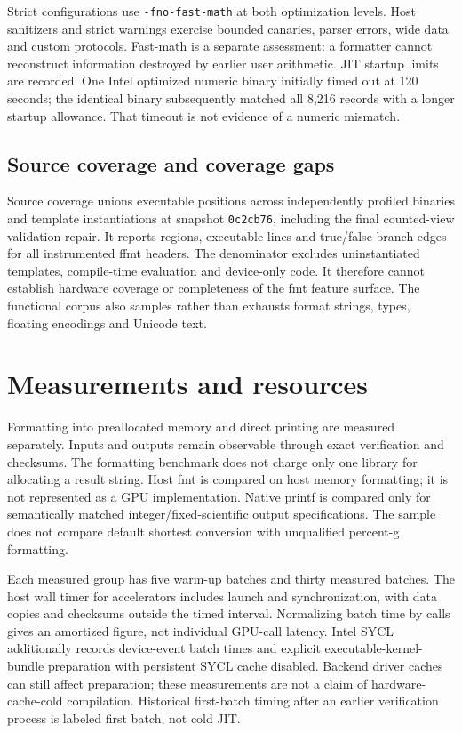 \documentclass[11pt,letterpaper]{article}
\begin{document}
Strict configurations use \texttt{-fno-fast-math} at both optimization levels.
Host sanitizers and strict warnings exercise bounded canaries, parser errors,
wide data and custom protocols. Fast-math is a separate assessment: a
formatter cannot reconstruct information destroyed by earlier user arithmetic.
JIT startup limits are recorded. One Intel optimized numeric binary initially
timed out at 120 seconds; the identical binary subsequently matched all 8,216
records with a longer startup allowance. That timeout is not evidence of a
numeric mismatch.

\subsection{Source coverage and coverage gaps}

\begin{center}
\coveragetable
\end{center}

Source coverage unions executable positions across independently profiled
binaries and template instantiations at snapshot \texttt{0c2cb76}, including
the final counted-view validation repair. It reports regions, executable lines
and true/false branch edges for all instrumented ffmt headers. The denominator
excludes uninstantiated templates, compile-time evaluation and device-only
code. It therefore cannot establish hardware coverage or completeness of the
fmt feature surface. The functional corpus also samples rather than exhausts
format strings, types, floating encodings and Unicode text.

\section{Measurements and resources}

Formatting into preallocated memory and direct printing are measured
separately. Inputs and outputs remain observable through exact verification
and checksums. The formatting benchmark does not charge only one library for
allocating a result string. Host fmt is compared on host memory formatting;
it is not represented as a GPU implementation. Native printf is compared
only for semantically matched integer/fixed-scientific output specifications.
The sample does not compare default shortest conversion with unqualified
percent-g formatting.

Each measured group has five warm-up batches and thirty measured batches.
The host wall timer for accelerators includes launch and synchronization,
with data copies and checksums outside the timed interval. Normalizing batch
time by calls gives an amortized figure, not individual GPU-call latency.
Intel SYCL additionally records device-event batch times and explicit
executable-kernel-bundle preparation with persistent SYCL cache disabled.
Backend driver caches can still affect preparation; these measurements are
not a claim of hardware-cache-cold compilation. Historical first-batch timing
after an earlier verification process is labeled first batch, not cold JIT.
\end{document}
